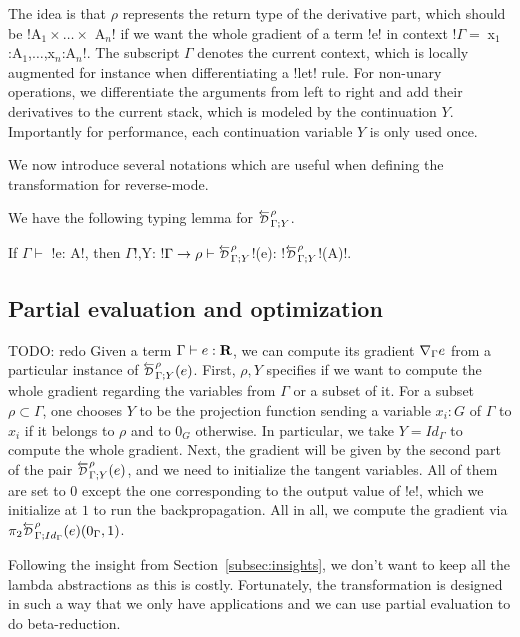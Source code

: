 The idea is that $\rho$ represents the return type of the derivative part, which should be !A$_{1} \times \ldots \times$ A$_n$! 
if we want the whole gradient of a term !e! in context !$\Gamma = \;$x$_{1}$:A$_{1}$,$\ldots$,x$_n$:A$_n$!.
The subscript $\Gamma$ denotes the current context, 
which is locally augmented for instance when differentiating a !let! rule.
For non-unary operations, we differentiate the arguments from left to right and add their derivatives to the current stack, 
which is modeled by the continuation $Y$. 
Importantly for performance, each continuation variable $Y$ is only used once.

We now introduce several notations which are useful when defining the transformation for reverse-mode.



We have the following typing lemma for $\directD{\rho}{\Gamma}{Y}$.
\begin{lemma}
    If $\Gamma \vdash$ !e: A!, then $\Gamma$!,Y: !$\Gamma\to \rho \vdash \directD{\rho}{\Gamma}{Y}$!(e): !$\directD{\rho}{\Gamma}{Y}$!(A)!.
\end{lemma}



\subsection{Partial evaluation and optimization} %
\label{sub:Partial evaluation and optimization}

TODO: redo
Given a term $\Gamma\vdash e : \mathbf{R}$, we can compute its gradient $\nabla_\Gamma e$ from a particular instance of 
$\directD{\rho}{\Gamma}{Y}(e)$. First, $\rho, Y$ specifies if we want to compute the whole gradient regarding the variables from $\Gamma$ or a subset of it.
For a subset $\rho\subset \Gamma$, one chooses $Y$ to be the projection function sending a variable 
$x_i:G$ of $\Gamma$ to $x_i$ if it belongs to $\rho$ and to $0_G$ otherwise.
In particular, we take $Y=Id_\Gamma$ to compute the whole gradient.
Next, the gradient will be given by the second part of the pair $\directD{\rho}{\Gamma}{Y}(e)$, 
and we need to initialize the tangent variables. All of them are set to $0$ except the one corresponding to the output value of !e!, 
which we initialize at $1$ to run the backpropagation. 
All in all, we compute the gradient via $\pi_2\directD{\rho}{\Gamma}{Id_\Gamma}(e)(0_\Gamma,1)$.

Following the insight from Section~\ref{subsec:insights}, 
we don't want to keep all the lambda abstractions as this is costly. 
Fortunately, the transformation is designed in such a way that we only have applications 
and we can use partial evaluation to do beta-reduction. 

